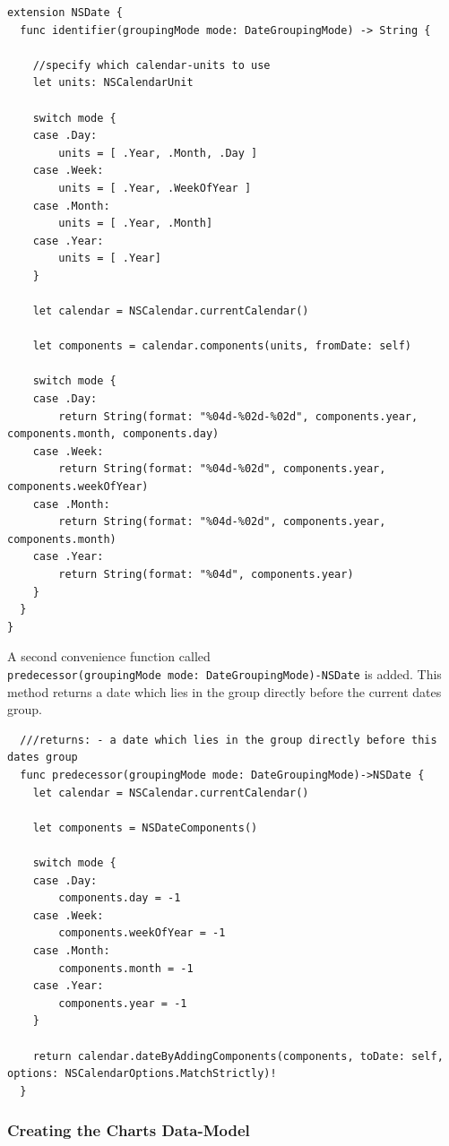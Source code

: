 \documentclass{article}
\begin{document}
\begin{verbatim}
extension NSDate {
  func identifier(groupingMode mode: DateGroupingMode) -> String {

    //specify which calendar-units to use
    let units: NSCalendarUnit

    switch mode {
    case .Day:
        units = [ .Year, .Month, .Day ]
    case .Week:
        units = [ .Year, .WeekOfYear ]
    case .Month:
        units = [ .Year, .Month]
    case .Year:
        units = [ .Year]
    }

    let calendar = NSCalendar.currentCalendar()

    let components = calendar.components(units, fromDate: self)

    switch mode {
    case .Day:
        return String(format: "%04d-%02d-%02d", components.year, components.month, components.day)
    case .Week:
        return String(format: "%04d-%02d", components.year, components.weekOfYear)
    case .Month:
        return String(format: "%04d-%02d", components.year, components.month)
    case .Year:
        return String(format: "%04d", components.year)
    }
  }
}
\end{verbatim}

A second convenience function called
\texttt{predecessor(groupingMode\ mode:\ DateGroupingMode)-NSDate}
is added. This method returns a date which lies in the group directly
before the current dates group.

\begin{verbatim}
  ///returns: - a date which lies in the group directly before this dates group
  func predecessor(groupingMode mode: DateGroupingMode)->NSDate {
    let calendar = NSCalendar.currentCalendar()

    let components = NSDateComponents()

    switch mode {
    case .Day:
        components.day = -1
    case .Week:
        components.weekOfYear = -1
    case .Month:
        components.month = -1
    case .Year:
        components.year = -1
    }

    return calendar.dateByAddingComponents(components, toDate: self, options: NSCalendarOptions.MatchStrictly)!
  }
\end{verbatim}

\subsubsection{Creating the Charts Data-Model}\label{creating-the-charts-data-model}
\end{document}

